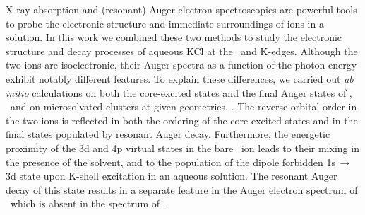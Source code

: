 X-ray absorption and (resonant) Auger electron spectroscopies are powerful tools to probe the electronic structure and immediate surroundings of ions in a solution. In this work we combined these two methods to study the electronic structure and decay processes of aqueous KCl at the \ki~and \cli  K-edges.
Although the two ions are isoelectronic, their Auger spectra as a function of the photon energy exhibit notably different features. To explain these differences, we carried out {\it ab initio} calculations on both the core-excited states and the final Auger states of \ki, \cli~and on microsolvated clusters at given geometries. . 
%
%
The reverse orbital order in the two ions is reflected in both the ordering of the core-excited states and in the final states populated by resonant Auger decay. Furthermore, the energetic proximity of the 3d and 4p virtual states in the bare \ki~ion leads to their mixing in the presence of the solvent, and to the population of the dipole forbidden 1s$\,\rightarrow\,$3d state upon K-shell excitation in an aqueous solution. The resonant Auger decay of this state results in a separate feature in the Auger electron spectrum of \ki~which is absent in the spectrum of \cli.
